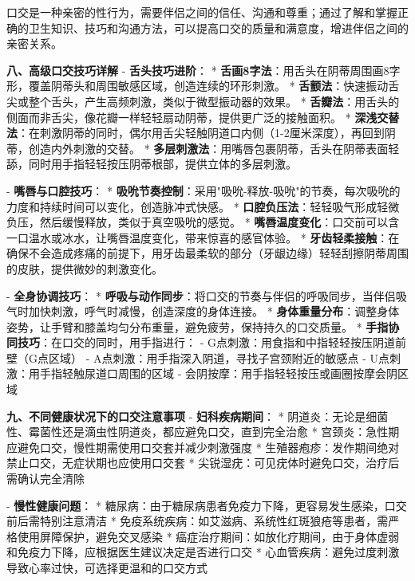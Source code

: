 \begin{enumerate}
口交是一种亲密的性行为，需要伴侣之间的信任、沟通和尊重；通过了解和掌握正确的卫生知识、技巧和沟通方法，可以提高口交的质量和满意度，增进伴侣之间的亲密关系。

  \textbf{八、高级口交技巧详解}
  - \textbf{舌头技巧进阶}：
    * \textbf{舌画8字法}：用舌头在阴蒂周围画8字形，覆盖阴蒂头和周围敏感区域，创造连续的环形刺激。
    * \textbf{舌颤法}：快速振动舌尖或整个舌头，产生高频刺激，类似于微型振动器的效果。
    * \textbf{舌瓣法}：用舌头的侧面而非舌尖，像花瓣一样轻轻扇动阴蒂，提供更广泛的接触面积。
    * \textbf{深浅交替法}：在刺激阴蒂的同时，偶尔用舌尖轻触阴道口内侧（1-2厘米深度），再回到阴蒂，创造内外刺激的交替。
    * \textbf{多层刺激法}：用嘴唇包裹阴蒂，舌头在阴蒂表面轻舔，同时用手指轻轻按压阴蒂根部，提供立体的多层刺激。

  - \textbf{嘴唇与口腔技巧}：
    * \textbf{吸吮节奏控制}：采用"吸吮-释放-吸吮"的节奏，每次吸吮的力度和持续时间可以变化，创造脉冲式快感。
    * \textbf{口腔负压法}：轻轻吸气形成轻微负压，然后缓慢释放，类似于真空吸吮的感觉。
    * \textbf{嘴唇温度变化}：口交前可以含一口温水或冰水，让嘴唇温度变化，带来惊喜的感官体验。
    * \textbf{牙齿轻柔接触}：在确保不会造成疼痛的前提下，用牙齿最柔软的部分（牙龈边缘）轻轻刮擦阴蒂周围的皮肤，提供微妙的刺激变化。

  - \textbf{全身协调技巧}：
    * \textbf{呼吸与动作同步}：将口交的节奏与伴侣的呼吸同步，当伴侣吸气时加快刺激，呼气时减慢，创造深度的身体连接。
    * \textbf{身体重量分布}：调整身体姿势，让手臂和膝盖均匀分布重量，避免疲劳，保持持久的口交质量。
    * \textbf{手指协同技巧}：在口交的同时，用手指进行：
      - G点刺激：用食指和中指轻轻按压阴道前壁（G点区域）
      - A点刺激：用手指深入阴道，寻找子宫颈附近的敏感点
      - U点刺激：用手指轻触尿道口周围的区域
      - 会阴按摩：用手指轻轻按压或画圈按摩会阴区域

  \textbf{九、不同健康状况下的口交注意事项}
  - \textbf{妇科疾病期间}：
    * 阴道炎：无论是细菌性、霉菌性还是滴虫性阴道炎，都应避免口交，直到完全治愈
    * 宫颈炎：急性期应避免口交，慢性期需使用口交套并减少刺激强度
    * 生殖器疱疹：发作期间绝对禁止口交，无症状期也应使用口交套
    * 尖锐湿疣：可见疣体时避免口交，治疗后需确认完全清除

  - \textbf{慢性健康问题}：
    * 糖尿病：由于糖尿病患者免疫力下降，更容易发生感染，口交前后需特别注意清洁
    * 免疫系统疾病：如艾滋病、系统性红斑狼疮等患者，需严格使用屏障保护，避免交叉感染
    * 癌症治疗期间：如放化疗期间，由于身体虚弱和免疫力下降，应根据医生建议决定是否进行口交
    * 心血管疾病：避免过度刺激导致心率过快，可选择更温和的口交方式


\end{enumerate}
